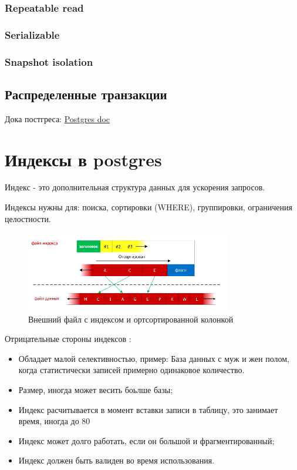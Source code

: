 \subsubsection{Repeatable read}
\subsubsection{Serializable}
\subsubsection{Snapshot isolation}

\subsection{Распределенные транзакции}

Дока постгреса:
\href{https://www.postgresql.org/docs/12/sql-prepare-transaction.html}{Postgres doc}

\section{Индексы в postgres}
Индекс - это дополнительная структура данных для ускорения запросов.

Индексы нужны для: поиска, сортировки (WHERE), группировки, ограничения целостности.

\begin{figure}[h!]
\centering
\includegraphics[width=0.8\textwidth]{img/index-sort.png}
\caption{Внешний файл с индексом и ортсортированной колонкой}
\label{index-sort}
\end{figure}

Отрицательные стороны индексов \label{index-usage}:
\begin{itemize}
\item Обладает малой селективностью, пример:
База данных с муж и жен полом, когда статистически записей примерно одинаковое количество.
\item Размер, иногда может весить боьлше базы;
\item Индекс расчитывается в момент вставки записи в таблицу, это занимает время, иногда до 80%
\item Индекс может долго работать, если он большой и фрагментированный;
\item Индекс должен быть валиден во время использования.
\end{itemize}

